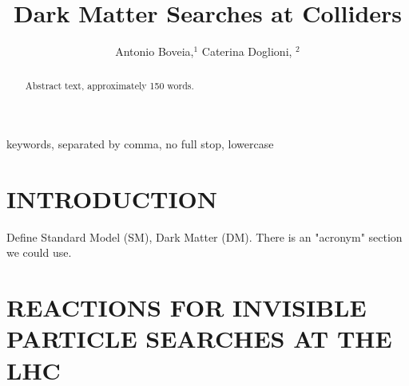 \documentclass{ar-1col}
\begin{document}

\title{Dark Matter Searches at Colliders}

\newcommand{\chiDM}{\ensuremath{\chi}\xspace}
\newcommand{\mMed}{\ensuremath{M_{\rm{med}}}\xspace}
\newcommand{\mmed}{\mMed}
\newcommand{\gDM}{\ensuremath{g_{\chiDM}}\xspace}
\newcommand{\gdm}{\gDM}
\newcommand{\gdmq}{\ensuremath{g_{\chiDM q}}\xspace}
\newcommand{\gq}{$g_{\mathrm{q}}$\xspace}
\newcommand{\ifb}{\ensuremath{\mathrm{fb}^{-1}}\xspace}
\newcommand{\mdm}{\ensuremath{m_{\chiDM}}\xspace}
\newcommand{\mDM}{\mdm}
\newcommand{\ghZprimeZprime}{\ensuremath{g_{hZ'Z'}}\xspace}
\newcommand{\gZPrime}{\ensuremath{g_{Z'}}\xspace}
\newcommand{\gZprime}{\ensuremath{g_{Z'}}\xspace}
\newcommand{\sinthetab}{\ensuremath{sin(\theta_B}\xspace}
\newcommand{\sinthetahS}{\ensuremath{sin(\theta_{hS}}\xspace}
\newcommand{\pt}{\ensuremath{p_\mathrm{T}}\xspace}
\newcommand{\pT}{\ensuremath{p_\mathrm{T}}\xspace}
\newcommand{\MET}{\ensuremath{\slashed{E}_T}\xspace}


\author{Antonio Boveia,$^1$ Caterina Doglioni, $^2$
}

\begin{abstract}
Abstract text, approximately 150 words. 
\end{abstract}

\begin{keywords}
keywords, separated by comma, no full stop, lowercase
\end{keywords}
\maketitle

\tableofcontents


\section{INTRODUCTION}
\label{sec:intro}

Define Standard Model (SM), Dark Matter (DM). There is an "acronym" section we could use. 


%

\section{REACTIONS FOR INVISIBLE PARTICLE SEARCHES AT THE LHC}
\label{sec:02_Reactions}
\end{document}
